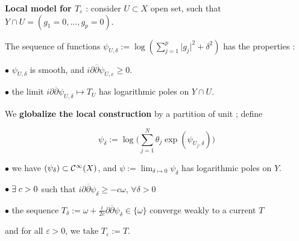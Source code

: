 \begin{slide}

\par\vspace{\bigskipamount}\noindent
{\bf  Local model for $T_\varepsilon$ }:
 consider $U\subset X$ open set, such that 
$Y\cap U= (g_1= 0, ..., g_p= 0)$. 

\par\noindent The sequence of functions $\psi_{U,\delta}:= 
\log (\displaystyle\sum_{j=1}^p\vert g_j\vert ^2+ \delta^2)$ has the properties :
\vskip 5pt
\par\hspace{0.5cm} $\bullet$  $\psi_{U,\delta}$ is smooth, and 
$i\partial\overline \partial\psi_{U,\varepsilon}\geq 0$.
\vskip 5pt\par\hspace{0.5cm} $\bullet$  the limit 
$i\partial\overline \partial\psi_{U,\delta}
\mapsto T_U$ has logarithmic poles on $Y\cap U$.

\par\vspace{\bigskipamount}\noindent
We {\bf globalize the local construction} by a partition of unit ; define

$$\psi_{\delta}:= \log \bigl(\sum_{j=1}^N\theta_j\exp(\psi_{U_j,\delta})\bigr)$$

\par\hspace{0.5cm} $\bullet$ we have $(\psi_{\delta})\subset {\cal C}^{\infty}(X)$, and 
$\displaystyle \psi:= \lim_{\delta \mapsto 0}\psi_{\delta}$ has logarithmic poles on $Y$.

\vskip 5pt
\par\hspace{0.5cm} $\bullet \hspace{0.1cm} \exists \hspace{0.1cm} c> 0$ such that 
$i\partial\overline \partial\psi_{\delta}\geq -c\omega$, $\forall \delta> 0$
\vskip 5pt
\par\hspace{0.5cm} $\bullet$ the sequence $T_\delta:= \omega+ 
\frac {i}{2c}\partial\overline \partial\psi_\delta\in \{\omega\}$ converge weakly
to a current $T$ 

\par\hspace{0.7cm} and for all $\varepsilon> 0$, we take $T_\varepsilon:= T$.

\end{slide}



